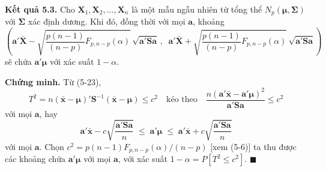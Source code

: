 \medskip
\noindent\textbf{Kết quả 5.3.} Cho $\mathbf{X}_1,\mathbf{X}_2,\dots,\mathbf{X}_n$ là một mẫu ngẫu nhiên từ tổng thể $N_p(\boldsymbol{\mu},\boldsymbol{\Sigma})$ với $\boldsymbol{\Sigma}$ xác định dương. Khi đó, đồng thời với mọi $\mathbf{a}$, khoảng
\[
  \left(\mathbf{a}'\bar{\mathbf{X}}-\sqrt{\dfrac{p(n-1)}{(n-p)}F_{p,n-p}(\alpha)}\,\sqrt{\mathbf{a}'\mathbf{S}\mathbf{a}}\,,\;\;
        \mathbf{a}'\bar{\mathbf{X}}+\sqrt{\dfrac{p(n-1)}{(n-p)}F_{p,n-p}(\alpha)}\,\sqrt{\mathbf{a}'\mathbf{S}\mathbf{a}}\right)
\]
sẽ chứa $\mathbf{a}'\boldsymbol{\mu}$ với xác suất $1-\alpha$.
 
\medskip
\noindent\textbf{Chứng minh.} Từ (5-23),
\[
  T^2 = n(\bar{\mathbf{x}}-\boldsymbol{\mu})'\mathbf{S}^{-1}(\bar{\mathbf{x}}-\boldsymbol{\mu})\le c^2
  \quad\text{kéo theo}\quad
  \frac{n(\mathbf{a}'\bar{\mathbf{x}}-\mathbf{a}'\boldsymbol{\mu})^2}{\mathbf{a}'\mathbf{S}\mathbf{a}}\le c^2
\]
với mọi $\mathbf{a}$, hay
\[
  \mathbf{a}'\bar{\mathbf{x}} - c\sqrt{\frac{\mathbf{a}'\mathbf{S}\mathbf{a}}{n}}\;\le\;\mathbf{a}'\boldsymbol{\mu}\;\le\;\mathbf{a}'\bar{\mathbf{x}} + c\sqrt{\frac{\mathbf{a}'\mathbf{S}\mathbf{a}}{n}}
\]
với mọi $\mathbf{a}$. Chọn $c^2 = p(n-1)F_{p,n-p}(\alpha)/(n-p)$ [xem (5-6)] ta thu được các khoảng chứa $\mathbf{a}'\boldsymbol{\mu}$ với mọi $\mathbf{a}$, với xác suất $1-\alpha = P[T^2\le c^2]$. \hfill$\blacksquare$
 
